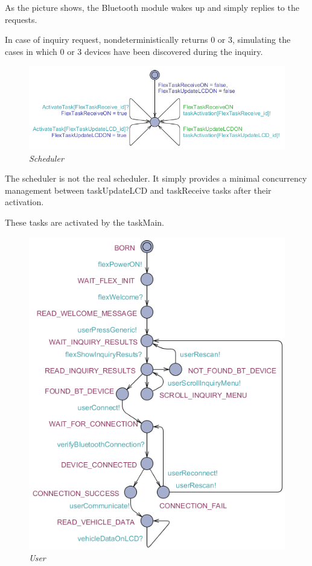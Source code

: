 \documentclass[paper=a4, fontsize=11pt]{scrartcl} %
\numberwithin{equation}{section} %
\numberwithin{figure}{section} %
\numberwithin{table}{section} %
\begin{document}
As the picture shows, the Bluetooth module wakes up and simply replies to the requests.

In case of inquiry request, nondeterministically returns 0 or 3, simulating the cases in which 0 or 3 devices have been discovered during the inquiry.

\begin{figure}[H]
  \centering
  \includegraphics[width=6in]{img/FLEX-OBD-LCD_scheduler}
  \caption{\textit{Scheduler}}
\end{figure}

The scheduler is not the real scheduler. It simply provides a minimal concurrency management between taskUpdateLCD and taskReceive tasks after their activation.

These tasks are activated by the taskMain.

\begin{figure}[H]
  \centering
  \includegraphics[width=4.7in]{img/FLEX-OBD-LCD_user}
  \caption{\textit{User}}
\end{figure}
\end{document}
